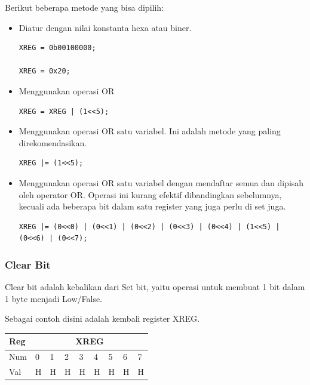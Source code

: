 \documentclass[12pt,]{article}
\begin{document}
	Berikut beberapa metode yang bisa dipilih:
	\begin{itemize}
		\item Diatur dengan nilai konstanta hexa atau biner.
		\begin{verbatim}
XREG = 0b00100000;

XREG = 0x20;
		\end{verbatim}
		
		\item Menggunakan operasi OR
		\begin{verbatim}
XREG = XREG | (1<<5);
		\end{verbatim}
		
		\item Menggunakan operasi OR satu variabel.
		Ini adalah metode yang paling direkomendasikan.
		\begin{verbatim}
XREG |= (1<<5);
		\end{verbatim}
		
		\item Menggunakan operasi OR satu variabel dengan mendaftar semua dan dipisah oleh operator OR.
		Operasi ini kurang efektif dibandingkan sebelumnya,
		kecuali ada beberapa bit dalam satu register yang juga perlu di set juga.
		\begin{verbatim}
XREG |= (0<<0) | (0<<1) | (0<<2) | (0<<3) | (0<<4) | (1<<5) | (0<<6) | (0<<7);
		\end{verbatim}
	\end{itemize}
	
	\subsubsection{Clear Bit}
	
	Clear bit adalah kebalikan dari Set bit, yaitu operasi untuk membuat 1 bit dalam 1 byte menjadi Low/False.
	
	Sebagai contoh disini adalah kembali register XREG.

	\begin{table}[H]
		\begin{tabular}{|l|l|l|l|l|l|l|l|l|}
			\hline
			Reg & \multicolumn{8}{c|}{XREG}     \\ \hline
			Num & 0 & 1 & 2 & 3 & 4 & 5 & 6 & 7 \\ \hline
			Val & H & H & H & H & H & H & H & H \\ \hline
		\end{tabular}
	\end{table}
\end{document}

